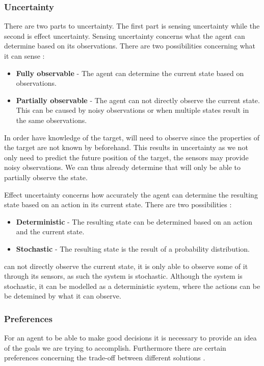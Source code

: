 \subsubsection{Uncertainty}

There are two parts to uncertainty. The first part is sensing uncertainty while
the second is effect uncertainty. Sensing uncertainty concerns what the agent
can determine based on its observations. There are two possibilities concerning
what it can sense \citep[ch.1.5.4]{MIBook}:
\begin{itemize}
  \item \textbf{Fully observable} - The agent can determine the current state
  based on observations.
  \item \textbf{Partially observable} - The agent can not directly observe the
  current state. This can be caused by noisy observations or when multiple
  states result in the same observations.
\end{itemize}

In order have knowledge of the target, \name will need to observe since the
properties of the target are not known by \name beforehand. This results in
uncertainty as we not only need to predict the future position of the target,
the sensors may provide noisy observations. We can thus already determine that
\name will only be able to partially observe the state.\nl

Effect uncertainty concerns how accurately the agent can determine the resulting
state based on an action in its current state. There are two possibilities
\citep[ch.1.5.4]{MIBook}:
\begin{itemize}
  \item \textbf{Deterministic} - The resulting state can be determined based on
  an action and the current state.
  \item \textbf{Stochastic} - The resulting state is the result of a probability
  distribution.
\end{itemize}

\name can not directly observe the current state, it is only able
to observe some of it through its sensors, as such the system is stochastic.
Although the system is stochastic, it can be modelled as a deterministic system, where
the actions can be be detemined by what it can observe.
 
\subsubsection{Preferences}
For an agent to be able to make good decisions it is necessary to provide an
idea of the goals we are trying to accomplish. Furthermore there are certain
preferences concerning the trade-off between different solutions
\citep[ch.1.5.5]{MIBook}.

